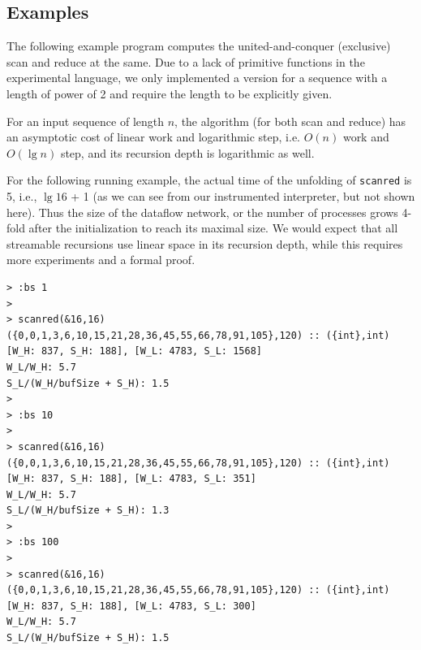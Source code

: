%
%
%


\subsection{Examples}

The following example program computes the united-and-conquer (exclusive) scan and reduce at the same. 
Due to a lack of primitive functions in the experimental language, we only implemented a version for a sequence with a length of power of 2 and require the length to be explicitly given. 

For an input sequence of length $n$, the algorithm (for both scan and reduce) has an asymptotic cost of linear work and logarithmic step, i.e. $O(n)$ work and $O(\lg{n})$ step, and its recursion depth is logarithmic as well. \\


\vspace{0.5cm}

For the following running example, the actual time of the unfolding of \texttt{scanred} is 5, i.e., $\lg 16$ + 1 (as we can see from our instrumented interpreter, but not shown here). Thus the size of the dataflow network, or the number of processes grows 4-fold after the initialization to reach its maximal size.
We would expect that all streamable recursions use linear space in its recursion depth, while this requires more experiments and a formal proof. \\

\begin{lstlisting}[style=nesl-style]
> :bs 1
>
> scanred(&16,16)
({0,0,1,3,6,10,15,21,28,36,45,55,66,78,91,105},120) :: ({int},int)
[W_H: 837, S_H: 188], [W_L: 4783, S_L: 1568]
W_L/W_H: 5.7
S_L/(W_H/bufSize + S_H): 1.5
>
> :bs 10
>
> scanred(&16,16)
({0,0,1,3,6,10,15,21,28,36,45,55,66,78,91,105},120) :: ({int},int)
[W_H: 837, S_H: 188], [W_L: 4783, S_L: 351]
W_L/W_H: 5.7
S_L/(W_H/bufSize + S_H): 1.3
>
> :bs 100
>
> scanred(&16,16)
({0,0,1,3,6,10,15,21,28,36,45,55,66,78,91,105},120) :: ({int},int)
[W_H: 837, S_H: 188], [W_L: 4783, S_L: 300]
W_L/W_H: 5.7
S_L/(W_H/bufSize + S_H): 1.5
\end{lstlisting}
